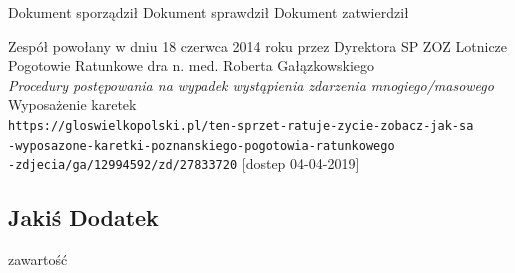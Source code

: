 \documentclass[11pt]{report}
\begin{document}
Dokument sporządził \hspace{1cm} Dokument sprawdził\hspace{1cm} Dokument zatwierdził 
\newline

\begin{thebibliography}{9}
Zespół powołany w dniu 18 czerwca 2014 roku
przez Dyrektora SP ZOZ Lotnicze Pogotowie Ratunkowe
dra n. med. Roberta Gałązkowskiego \\
\textit{Procedury postępowania na wypadek wystąpienia zdarzenia mnogiego/masowego}
Wyposażenie karetek\\
\texttt{https://gloswielkopolski.pl/ten-sprzet-ratuje-zycie-zobacz-jak-sa\\-wyposazone-karetki-poznanskiego-pogotowia-ratunkowego\\-zdjecia/ga/12994592/zd/27833720} [dostep 04-04-2019]
\end{thebibliography}
\begin{appendices}
\chapter{Jakiś Dodatek}
zawartość
\end{appendices}
\end{document}
